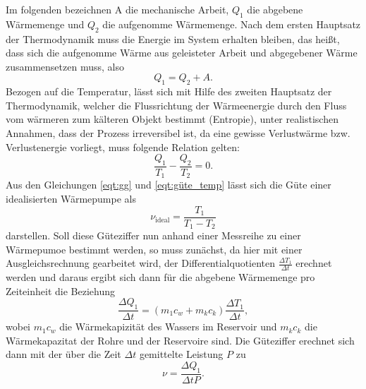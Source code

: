     Im folgenden bezeichnen A die mechanische Arbeit, $Q_1$ die abgebene Wärmemenge und $Q_2$ die aufgenomme Wärmemenge. 
    Nach dem ersten Hauptsatz der Thermodynamik muss die Energie im System erhalten bleiben, das heißt, dass sich die aufgenomme Wärme aus geleisteter Arbeit und abgegebener Wärme zusammensetzen muss, also
    \begin{equation}
      \label{eqt:gg}
      Q_1 = Q_2 + A .
    \end{equation}
    Bezogen auf die Temperatur, lässt sich mit Hilfe des zweiten Hauptsatz der Thermodynamik, welcher die Flussrichtung der Wärmeenergie durch den Fluss vom wärmeren zum kälteren Objekt bestimmt (Entropie), unter realistischen Annahmen,
    dass der Prozess irreversibel ist, da eine gewisse Verlustwärme bzw. Verlustenergie vorliegt,  
    muss folgende Relation gelten:
    \begin{equation}
      \label{eqt:güte_temp}
      \frac{Q_1}{T_1} - \frac{Q_2}{T_2} = 0 .
    \end{equation}
    Aus den Gleichungen \eqref{eqt:gg} und \eqref{eqt:güte_temp} lässt sich die Güte einer idealisierten Wärmepumpe als
    \begin{equation}
      \label{eqt:Güte}
      \nu_\text{ideal} = \frac {T_1}{T_1 - T_2}
    \end{equation}
    darstellen.
    Soll diese Güteziffer nun anhand einer Messreihe zu einer Wärmepumoe bestimmt werden, so muss zunächst, da hier mit einer Ausgleichsrechnung gearbeitet wird, der Differentialquotienten $\frac{\Delta T_1}{\Delta t }$
    erechnet werden und daraus ergibt sich dann für die abgebene Wärmemenge pro Zeiteinheit die Beziehung
    \begin{equation}
      \label{eqt:wärme_zeit}
      \frac{\Delta Q_1} {\Delta t} = (m_1 c_w + m_k c_k) \frac {\Delta T_1}{\Delta t},
    \end{equation}
    wobei $m_1 c_w$ die Wärmekapizität des Wassers im Reservoir und $m_k c_k$ die Wärmekapazitat der Rohre und der Reservoire sind.
    Die Güteziffer erechnet sich dann mit der über die Zeit $\Delta t$ gemittelte Leistung $P$ zu
    \begin{equation}
      \label{eqt:güte}
      \nu = \frac {\Delta Q_1}{\Delta t P}.
    \end{equation}
